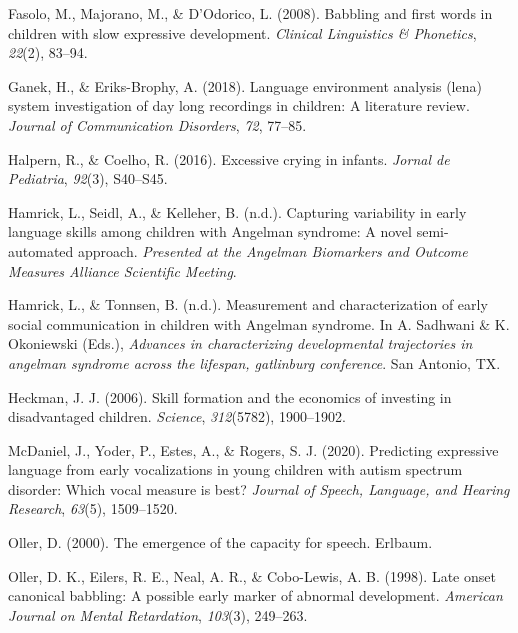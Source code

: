 \documentclass[english,,man]{apa6}
\begin{document}
\leavevmode\hypertarget{ref-fasolo2008babbling}{}%
Fasolo, M., Majorano, M., \& D'Odorico, L. (2008). Babbling and first words in children with slow expressive development. \emph{Clinical Linguistics \& Phonetics}, \emph{22}(2), 83--94.

\leavevmode\hypertarget{ref-ganek2018language}{}%
Ganek, H., \& Eriks-Brophy, A. (2018). Language environment analysis (lena) system investigation of day long recordings in children: A literature review. \emph{Journal of Communication Disorders}, \emph{72}, 77--85.

\leavevmode\hypertarget{ref-halpern2016excessive}{}%
Halpern, R., \& Coelho, R. (2016). Excessive crying in infants. \emph{Jornal de Pediatria}, \emph{92}(3), S40--S45.

\leavevmode\hypertarget{ref-hamrick2019capturing}{}%
Hamrick, L., Seidl, A., \& Kelleher, B. (n.d.). Capturing variability in early language skills among children with Angelman syndrome: A novel semi-automated approach. \emph{Presented at the Angelman Biomarkers and Outcome Measures Alliance Scientific Meeting}.

\leavevmode\hypertarget{ref-hamrick2019measurement}{}%
Hamrick, L., \& Tonnsen, B. (n.d.). Measurement and characterization of early social communication in children with Angelman syndrome. In A. Sadhwani \& K. Okoniewski (Eds.), \emph{Advances in characterizing developmental trajectories in angelman syndrome across the lifespan, gatlinburg conference}. San Antonio, TX.

\leavevmode\hypertarget{ref-heckman2006skill}{}%
Heckman, J. J. (2006). Skill formation and the economics of investing in disadvantaged children. \emph{Science}, \emph{312}(5782), 1900--1902.

\leavevmode\hypertarget{ref-mcdaniel2020predicting}{}%
McDaniel, J., Yoder, P., Estes, A., \& Rogers, S. J. (2020). Predicting expressive language from early vocalizations in young children with autism spectrum disorder: Which vocal measure is best? \emph{Journal of Speech, Language, and Hearing Research}, \emph{63}(5), 1509--1520.

\leavevmode\hypertarget{ref-oller2000emergence}{}%
Oller, D. (2000). The emergence of the capacity for speech. Erlbaum.

\leavevmode\hypertarget{ref-oller1998late}{}%
Oller, D. K., Eilers, R. E., Neal, A. R., \& Cobo-Lewis, A. B. (1998). Late onset canonical babbling: A possible early marker of abnormal development. \emph{American Journal on Mental Retardation}, \emph{103}(3), 249--263.
\end{document}

